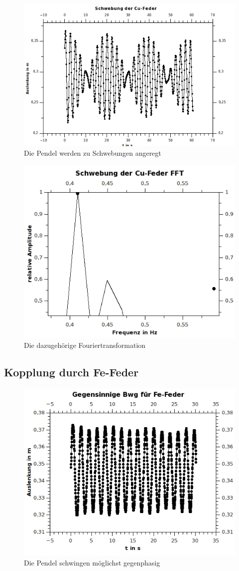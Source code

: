 \clearpage
\begin{figure}[h!]
\centering
\includegraphics[width=0.7\linewidth]{../Messungen/graphen/schwebung-Bwg-Cu}
\caption{Die Pendel werden zu Schwebungen angeregt}
\label{fig:schwebung-Bwg-Cu}
\end{figure}

\begin{figure}[h!]
\centering
\includegraphics[width=0.7\linewidth]{../Messungen/graphen/schwebung-Bwg-Cu-FFT}
\caption{Die dazugehörige Fouriertransformation}
\label{fig:schwebung-Bwg-Cu-FFT}
\end{figure}

\clearpage

\subsection{Kopplung durch Fe-Feder}

\begin{figure}[h!]
\centering
\includegraphics[width=0.65\linewidth]{../Messungen/graphen/gg-Bwg-Fe}
\caption{Die Pendel schwingen möglichst gegenphasig}
\label{fig:gg-Bwg-Fe}
\end{figure}

